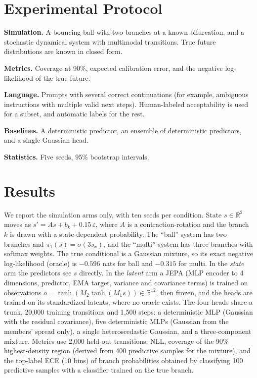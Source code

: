 \documentclass[conference]{IEEEtran}
\begin{document}
\section{Experimental Protocol}
\textbf{Simulation.} A bouncing ball with two branches at a known bifurcation, and a stochastic dynamical system with multimodal transitions. True future distributions are known in closed form.

\textbf{Metrics.} Coverage at 90\%, expected calibration error, and the negative log-likelihood of the true future.

\textbf{Language.} Prompts with several correct continuations (for example, ambiguous instructions with multiple valid next steps). Human-labeled acceptability is used for a subset, and automatic labels for the rest.

\textbf{Baselines.} A deterministic predictor, an ensemble of deterministic predictors, and a single Gaussian head.

\textbf{Statistics.} Five seeds, 95\% bootstrap intervals.

\section{Results}
We report the simulation arms only, with ten seeds per condition. State $s\in\mathbb{R}^2$ moves as $s'=As+b_k+0.15\,\varepsilon$, where $A$ is a contraction-rotation and the branch $k$ is drawn with a state-dependent probability. The ``ball'' system has two branches and $\pi_1(s)=\sigma(3s_x)$, and the ``multi'' system has three branches with softmax weights. The true conditional is a Gaussian mixture, so its exact negative log-likelihood (oracle) is $-0.596$ nats for ball and $-0.315$ for multi. In the \emph{state} arm the predictors see $s$ directly. In the \emph{latent} arm a JEPA (MLP encoder to 4 dimensions, predictor, EMA target, variance and covariance terms) is trained on observations $o=\tanh(M_2\tanh(M_1 s))\in\mathbb{R}^{12}$, then frozen, and the heads are trained on its standardized latents, where no oracle exists. The four heads share a trunk, 20{,}000 training transitions and 1{,}500 steps: a deterministic MLP (Gaussian with the residual covariance), five deterministic MLPs (Gaussian from the members' spread only), a single heteroscedastic Gaussian, and a three-component mixture. Metrics use 2{,}000 held-out transitions: NLL, coverage of the 90\% highest-density region (derived from 400 predictive samples for the mixture), and the top-label ECE (10 bins) of branch probabilities obtained by classifying 100 predictive samples with a classifier trained on the true branch.
\end{document}
